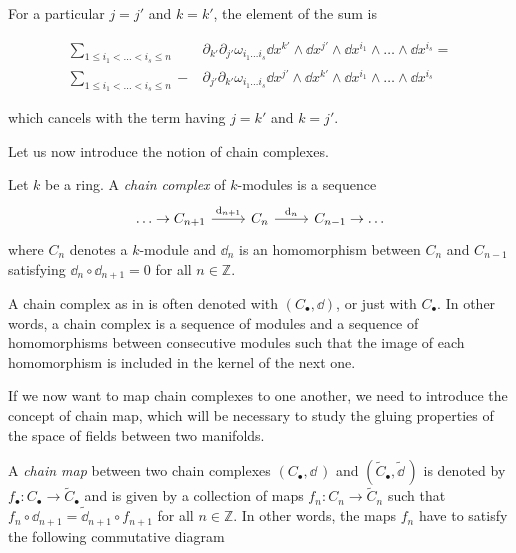 For a particular $j=j'$ and $k=k'$, the element of the sum is

\begin{align*}
     \sum_{1 \leq i_1 < \ldots < i_s \leq n} \phantom{-}
     &\partial_{k'} \partial_{j'} \omega_{i_1 \ldots i_s}
     \dd x^{k'} \wedge \dd x^{j'} \wedge \dd x^{i_1} \wedge \ldots \wedge \dd x^{i_s} = \\
     \sum_{1 \leq i_1 < \ldots < i_s \leq n}
     - &\partial_{j'} \partial_{k'} \omega_{i_1 \ldots i_s}
     \dd x^{j'} \wedge \dd x^{k'} \wedge \dd x^{i_1} \wedge \ldots \wedge \dd x^{i_s}
\end{align*}

which cancels with the term having $j = k'$ and $k=j'$.

Let us now introduce the notion of chain complexes.

\begin{definition}
\label{def:chain}
    Let $k$ be a ring. A \emph{chain complex} of $k$-modules is a sequence
    \begin{equation*}
        \begin{tikzcd}
            \ldots \rightarrow  C_{n+1} \arrow[r, "\dd _{n+1}"] & C_n
            \arrow[r, "\dd _{n}"] & C_{n-1} \rightarrow \ldots
        \end{tikzcd}
    \end{equation*}
    where $C_n$ denotes a $k$-module and $\dd _n$ is an homomorphism between $C_n$ and $C_{n-1}$ satisfying $\dd _n \circ \dd _{n+1} = 0$ for all $n \in \mathbb{Z}$.
\end{definition}

A chain complex as in  is often denoted with $(C_{\bullet}, \dd)$, or just with $C_{\bullet}$.
In other words, a chain complex is a sequence of modules and a sequence of homomorphisms between consecutive modules such that the image of each homomorphism is included in the kernel of the next one.

If we now want to map chain complexes to one another, we need to introduce the concept of chain map, which will be necessary to study the gluing properties of the space of fields between two manifolds.

\begin{definition}
\label{def:chain_map}
    A \emph{chain map} between two chain complexes $(C_\bullet, \dd \,)$ and $(\widetilde{C}_\bullet, \widetilde{\dd} \,)$ is denoted by $f_\bullet : C_\bullet \rightarrow \widetilde{C}_\bullet$ and is given by a collection of maps $f_n : C_n \rightarrow \widetilde{C}_n$ such that
    $f_n \circ \dd_{n+1} = \widetilde{\dd}_{n+1} \circ f_{n+1}$ for all $n \in \mathbb{Z}$.
    In other words, the maps $f_n$ have to satisfy the following commutative diagram
    \begin{equation*}
        
    \end{equation*}
\end{definition}

